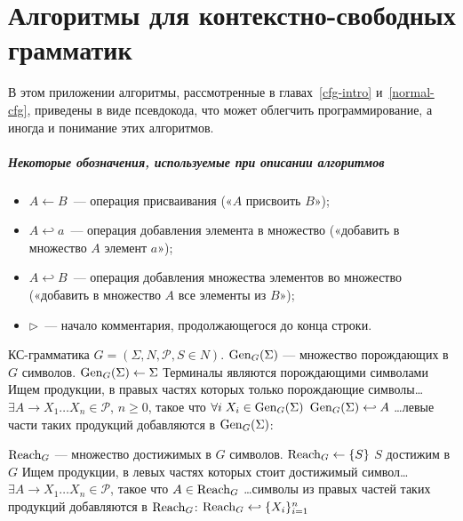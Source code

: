 \renewcommand{\theAlgoEnv}{\Alph{chapter}.\arabic{AlgoEnv}}

\chapter{Алгоритмы для контекстно-свободных грамматик}

В этом приложении алгоритмы, рассмотренные в
главах~\ref{cfg-intro} и~\ref{normal-cfg}, приведены в виде
псевдокода, что может облегчить программирование, а иногда и
понимание этих алгоритмов.

\paragraph{Некоторые обозначения, используемые при описании алгоритмов}
\begin{itemize}
    \item
${A \gets B}$~— операция присваивания («$A$ присвоить $B$»);

    \item
$A \hookleftarrow a$~— операция добавления элемента в множество («добавить в
множество $A$ элемент $a$»);

    \item
$A \hookleftarrow B$~— операция добавления
множества элементов во множество («добавить в множество $A$ все элементы из
$B$»);

    \item
${\rhd}$~— начало комментария, продолжающегося до конца строки.
\end{itemize}

{\label{algo-gen}КС-грамматика $G=(\Sigma, N, \mathcal P, S \in N)$.}
{$\operatorname{Gen}_G(\Sigma)$  — множество порождающих в $G$ символов.}
{%
\li $\operatorname{Gen}_G(\Sigma) \gets \Sigma$ \Comment Терминалы являются порождающими
символами
\zi\Comment Ищем продукции, в правых частях которых только порождающие символы\ldots
\li \While $\exists A \to X_1 \ldots X_n \in \mathcal P$, $n \geqslant 0$,
такое что $\forall i \; X_i \in \operatorname{Gen}_G(\Sigma)$  \label{gen-induction}
\zi     \Do
        $\operatorname{Gen}_G(\Sigma) \hookleftarrow A$ \Comment \ldots левые части таких
        продукций добавляются в $\operatorname{Gen}_G(\Sigma)$:
        \End
}

\newcommand{\GenGS}{\ensuremath{\Gen_G(\Sigma)}}

{$\operatorname{Reach}_G$  — множество достижимых в $G$ символов.}
{%
\li $\operatorname{Reach}_G \gets \{ S \}$ \Comment $S$ достижим в $G$
\zi\Comment Ищем продукции, в левых частях которых стоит достижимый символ\ldots
\li \While $\exists A \to X_1 \ldots X_n \in \mathcal P$, такое что
    $A \in \operatorname{Reach}_G$
\zi \Comment \ldots символы из правых частей таких продукций добавляются
в $\operatorname{Reach}_G$:
\zi     \Do
        $\operatorname{Reach}_G \hookleftarrow \{ X_i \}_{i=1}^n$
        \End
    \End
}

